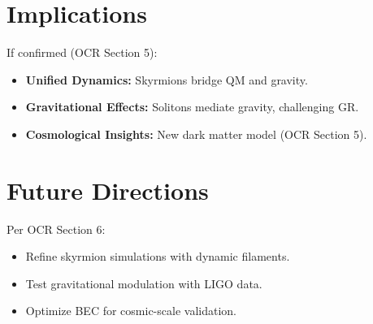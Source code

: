 \documentclass{article}
\begin{document}
\section{Implications}
If confirmed (OCR Section 5):
\begin{itemize}
    \item \textbf{Unified Dynamics:} Skyrmions bridge QM and gravity.
    \item \textbf{Gravitational Effects:} Solitons mediate gravity, challenging GR.
    \item \textbf{Cosmological Insights:} New dark matter model (OCR Section 5).
\end{itemize}

\section{Future Directions}
Per OCR Section 6:
\begin{itemize}
    \item Refine skyrmion simulations with dynamic filaments.
    \item Test gravitational modulation with LIGO data.
    \item Optimize BEC for cosmic-scale validation.
\end{itemize}
\end{document}

